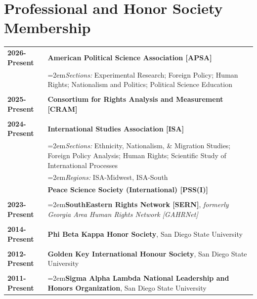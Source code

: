 \documentclass[letterpaper,12pt]{article}
\begin{document}
\section{Professional and Honor Society Membership}
\begin{xltabular}{\dimexpr\textwidth-0in}{p{1.5in}X}
\textbf{2026-Present} 	&  \textbf{American Political Science Association [APSA]}\\
                     			&  \hangindent=2em\textit{Sections:} Experimental Research; Foreign Policy; Human Rights; Nationalism and Politics; Political Science Education\\ \\
					
\textbf{2025-Present} 	&  \textbf{Consortium for Rights Analysis and Measurement [CRAM]}\\ \\

			
\textbf{2024-Present} 	&  \textbf{International Studies Association [ISA]}\\
                     			&  \hangindent=2em\textit{Sections:} Ethnicity, Nationalism, \& Migration Studies; Foreign Policy Analysis; Human Rights; \mbox{Scientific} Study of International Processes\\
					&  \hangindent=2em\textit{Regions:} ISA-Midwest, ISA-South\\ 
					&  \textbf{Peace Science Society (International) [PSS(I)]}\\ \\
			
\textbf{2023-Present} 	& \hangindent=2em\textbf{SouthEastern Rights Network [SERN]}, \textit{formerly Georgia Area Human Rights Network [GAHRNet]}\\ \\
			
\textbf{2014-Present} 	&  \textbf{Phi Beta Kappa Honor Society}, San Diego State University\\ \\

\textbf{2012-Present} 	&  \textbf{Golden Key International Honour Society}, San Diego State University\\ \\

\textbf{2011-Present} 	&  \hangindent=2em\textbf{Sigma Alpha Lambda National Leadership and Honors Organization}, San Diego State University
\end{xltabular}
\end{document}
